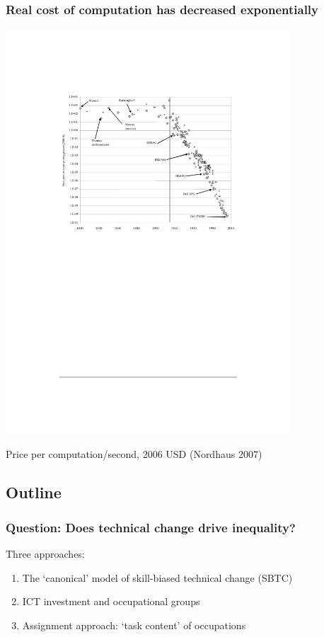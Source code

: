 \documentclass[red]{beamer}
\begin{document}
\begin{frame}[c]
\frametitle{Real cost of computation has decreased exponentially}
\begin{center}
  \includegraphics[width=0.8\textwidth]{slides_fig/nordhaus_2007.pdf}
\end{center}
Price per computation/second, 2006 USD (Nordhaus 2007)
\end{frame}

\subsection{Outline}
\begin{frame}[c]
\frametitle{Question: Does technical change drive inequality?}
Three approaches:
\begin{enumerate}
\vfill\item The `canonical' model of skill-biased technical change (SBTC)
\pause
\vfill\item ICT investment and occupational groups
\pause
\vfill\item Assignment approach: `task content' of occupations
\end{enumerate}
\end{frame}
\end{document}
